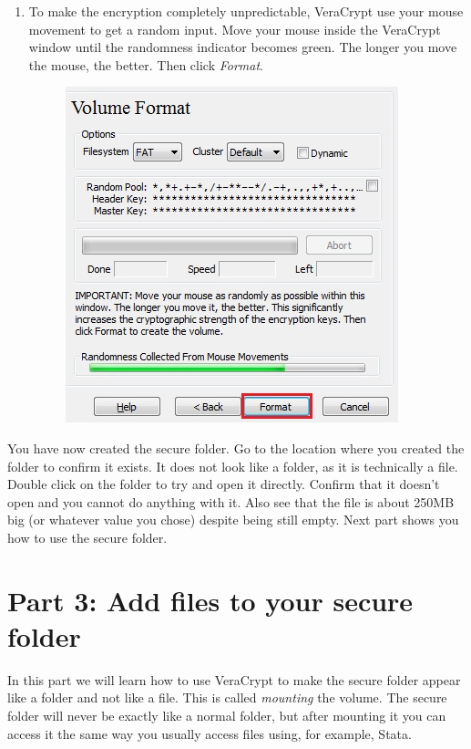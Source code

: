 \documentclass{tufte-handout}
\begin{document}
\begin{enumerate}
	
	\item To make the encryption completely unpredictable, VeraCrypt use your mouse movement to get a random input. Move your mouse inside the VeraCrypt window until the randomness indicator becomes green. The longer you move the mouse, the better. Then click \textit{Format}.
	\begin{figure}%
		\includegraphics[width=.7\linewidth]{img/vc_install_9.png}
	\end{figure}
	\FloatBarrier
\end{enumerate}

	\noindent You have now created the secure folder. Go to the location where you created the folder to confirm it exists. It does not look like a folder, as it is technically a file. Double click on the folder to try and open it directly. Confirm that it doesn't open and you cannot do anything with it. Also see that the file is about 250MB big (or whatever value you chose) despite being still empty. Next part shows you how to use the secure folder.

\section{Part 3: Add files to your secure folder}

	In this part we will learn how to use VeraCrypt to make the secure folder appear like a folder and not like a file. This is called \textit{mounting} the volume. The secure folder will never be exactly like a normal folder, but after mounting it you can access it the same way you usually access files using, for example, Stata.
	
\end{document}
